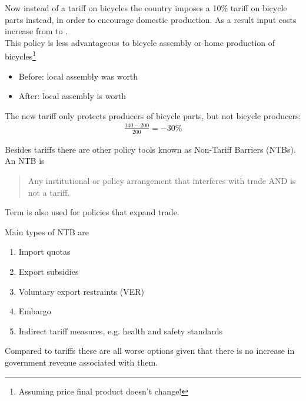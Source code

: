 \documentclass{beamer}
\begin{document}
\begin{frame}
  Now instead of a tariff on bicycles the country imposes a 10\% tariff on bicycle parts instead, in order to encourage domestic production. 
  As a result input costs increase from  to .\\
  \medskip
  This policy is less advantageous to bicycle assembly or home production of bicycles\footnote{Assuming price final product doesn't change!}
  \begin{itemize}
    \item Before: local assembly was worth 
    \item After: local assembly is worth 
  \end{itemize}
  The new tariff only protects producers of bicycle parts, but not bicycle producers:
  \begin{align*}
    \frac{140-200}{200}=-30\%
  \end{align*}  
\end{frame}

\begin{frame}
 Besides tariffs there are other policy tools known as Non-Tariff Barriers (NTBs).
 An NTB is
 \begin{quote}
 Any institutional or policy arrangement that interferes with trade AND is not a tariff.
 \end{quote}
 \medskip
 Term is also used for policies that expand trade. 
\end{frame}

\begin{frame}
  Main types of NTB are
  \begin{enumerate}
    \item Import quotas
    \item Export subsidies    
    \item Voluntary export restraints (VER)
    \medskip
    \item Embargo
    \item Indirect tariff measures, e.g. health and safety standards
  \end{enumerate}
  \medskip  
  Compared to tariffs these are all worse options given that there is no increase in government revenue associated with them.  
\end{frame}
\end{document}
